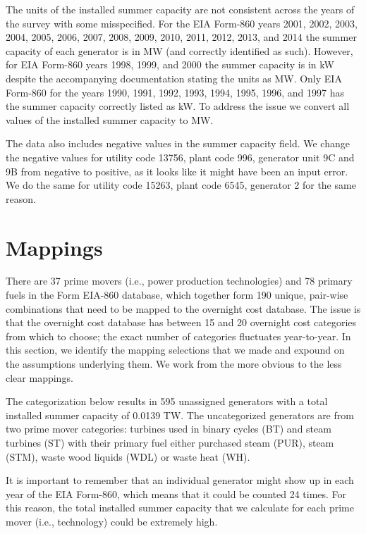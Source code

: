 \documentclass[10pt]{report}
\begin{document}
The units of the installed summer capacity are not consistent across the years of the survey with some misspecified. 
For the EIA Form-860 years 2001, 2002, 2003, 2004, 2005, 2006, 2007, 2008, 2009, 2010, 2011, 2012, 2013, and 2014 the summer capacity of each generator is in MW (and correctly identified as such). 
However, for EIA Form-860 years 1998, 1999, and 2000 the summer capacity is in kW despite the accompanying documentation stating the units as MW. 
Only EIA Form-860 for the years 1990, 1991, 1992, 1993, 1994, 1995, 1996, and 1997 has the summer capacity correctly listed as kW. 
To address the issue we convert all values of the installed summer capacity to MW.

The data also includes negative values in the summer capacity field. 
We change the negative values for utility code 13756, plant code 996, generator unit 9C and 9B from negative to positive, as it looks like it might have been an input error.
We do the same for utility code 15263, plant code 6545, generator 2 for the same reason.

\section{Mappings}
There are 37 prime movers (i.e., power production technologies) and 78 primary fuels in the Form EIA-860 database, which together form 190 unique, pair-wise combinations that need to be mapped to the overnight cost database. 
The issue is that the overnight cost database has between 15 and 20 overnight cost categories from which to choose; the exact number of categories fluctuates year-to-year.
In this section, we identify the mapping selections that we made and expound on the assumptions underlying them.
We work from the more obvious to the less clear mappings.

The categorization below results in 595 unassigned generators  with a total installed summer capacity of 0.0139 TW.
The uncategorized generators are from two prime mover categories: turbines used in binary cycles (BT) and steam turbines (ST) with their primary fuel either purchased steam (PUR), steam (STM), waste wood liquids (WDL) or waste heat (WH).

It is important to remember that an individual generator might show up in each year of the EIA Form-860, which means that it could be counted 24 times.
For this reason, the total installed summer capacity that we calculate for each prime mover (i.e., technology) could be extremely high. 
\end{document}
